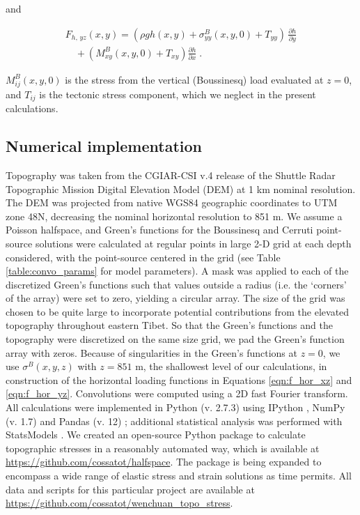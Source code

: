 \documentclass[twocolumn,jgrga]{AGUTeX}
\begin{document}
\begin{article}
and

\begin{equation}
\begin{split}
F_{h, \, yz}(x,y) = ( \rho g h(x,y) + \sigma_{yy}^B(x,y,0) + T_{yy} )\, \frac{\partial h}{ \partial y} \\
\quad + (M_{xy}^{B}(x,y,0) + T_{xy}) \frac{\partial h}{ \partial x}\; . 
\end{split}
\label{eqn:f_hor_yz}
\end{equation}

$M_{ij}^B(x,y,0)$ is the stress from the vertical (Boussinesq) load
evaluated at $z=0$, and $T_{ij}$ is the tectonic stress component, which
we neglect in the present calculations.

\subsection{Numerical implementation}\label{numerical-implementation}

Topography was taken from the CGIAR-CSI v.4 release
\citep{jarvis2008srtm} of the Shuttle Radar Topographic Mission
\citep{farr2007srtm} Digital Elevation Model (DEM) at 1 km nominal
resolution. The DEM was projected from native WGS84 geographic
coordinates to UTM zone 48N, decreasing the nominal horizontal
resolution to 851 m. We assume a Poisson halfspace, and Green's
functions for the Boussinesq and Cerruti point-source solutions were
calculated at regular points in large 2-D grid at each depth
considered, with the point-source centered in the grid (see Table
\ref{table:convo_params} for model parameters). A mask was applied to
each of the discretized Green's functions such that values outside a 
radius (i.e. the `corners' of the array) were set to zero, yielding a
circular array. The size of the
grid was chosen to be quite large to incorporate potential contributions
from the elevated topography throughout eastern Tibet. So that the
Green's functions and the topography were discretized on the same size
grid, we pad the Green's function array with zeros. Because of
singularities in the Green's functions at $z=0$, we use
$\sigma^B(x,y,z)$ with $z=851$ m, the shallowest level of our
calculations, in construction of the horizontal loading functions in
Equations \ref{eqn:f_hor_xz} and \ref{eqn:f_hor_yz}. Convolutions were
computed using a 2D fast Fourier transform. All calculations were
implemented in Python (v. 2.7.3) using IPython \citep{perez2007ipython},
NumPy (v. 1.7) \citep{oliphant2007numpy} and Pandas (v. 12)
\citep{mckinney2010}; additional statistical analysis was performed with
StatsModels \citep{seabold2010}. We created an open-source Python package
to calculate topographic stresses in a reasonably automated way, which
is available at \url{https://github.com/cossatot/halfspace}. The package
is being expanded to encompass a wide range of elastic stress and strain
solutions as time permits. All data and scripts for this particular
project are available at
\url{https://github.com/cossatot/wenchuan_topo_stress}.


\end{article}
\end{document}
